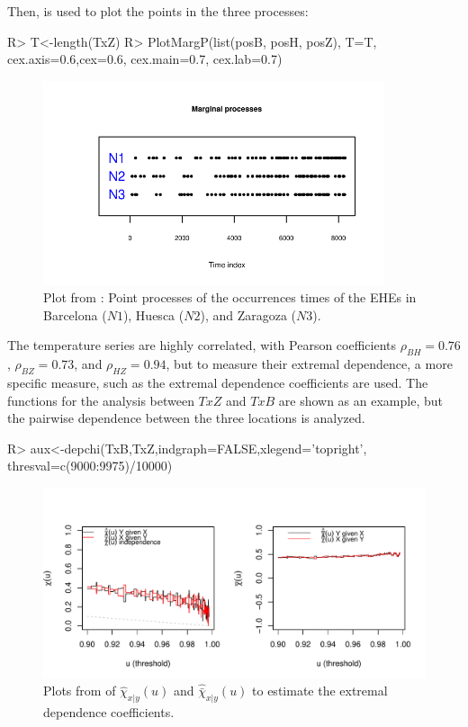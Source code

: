 Then,  is used to plot the  points in the three processes:
\begin{example}
R> T<-length(TxZ)
R> PlotMargP(list(posB, posH, posZ), T=T, cex.axis=0.6,cex=0.6, 
             cex.main=0.7, cex.lab=0.7)
\end{example}


\vspace*{-0.8cm}			
\begin{figure}[h]
\includegraphics[width=10cm]{figure/Sev1-1} 
\caption{Plot from : Point processes of the occurrences times of the  EHEs in  Barcelona ($N1$), Huesca ($N2$), and Zaragoza ($N3$).}
\end{figure}
		
The temperature series are highly correlated,  with   Pearson  coefficients  $\rho_{BH}=0.76$,  $\rho_{BZ}=0.73$,  and $\rho_{HZ}=0.94$, but to measure their extremal dependence, a more specific measure, such as the extremal dependence coefficients are used. The functions for the analysis between  $TxZ$ and $TxB$ are shown as an example,  but the pairwise dependence between the three locations is analyzed.

\begin{example}
R> aux<-depchi(TxB,TxZ,indgraph=FALSE,xlegend='topright',
               thresval=c(9000:9975)/10000)
\end{example}
\vspace*{-0.8cm}	
\begin{figure}[h]
	\begin{center}
	\includegraphics[width=12cm]{figure/Sev2-1} 
	\caption{Plots from  of  $\hat \chi_{x|y}(u)$ and $ \hat{\bar \chi}_{x|y}(u)$  to estimate the extremal dependence coefficients.}
	\end{center}
\end{figure}



